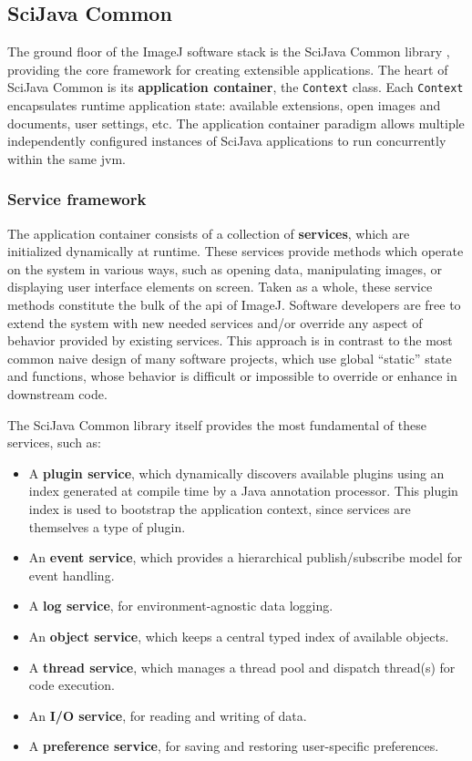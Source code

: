 \documentclass{bmcart}
\begin{document}
\subsection*{SciJava Common}
The ground floor of the ImageJ software stack is the SciJava Common library
\cite{imagej_sjc}, providing the core framework for creating extensible
applications. The heart of SciJava Common is its \textbf{application
container}, the \texttt{Context} class. Each \texttt{Context} encapsulates
runtime application state: available extensions, open images and documents,
user settings, etc. The application container paradigm allows multiple
independently configured instances of SciJava applications to run concurrently
within the same \acrfull{jvm}.

\subsubsection*{Service framework}
The application container consists of a collection of \textbf{services}, which
are initialized dynamically at runtime. These services provide methods which
operate on the system in various ways, such as opening data, manipulating
images, or displaying user interface elements on screen. Taken as a whole,
these service methods constitute the bulk of the \acrfull{api} of ImageJ.
Software developers are free to extend the system with new needed services
and/or override any aspect of behavior provided by existing services. This
approach is in contrast to the most common naive design of many software
projects, which use global ``static'' state and functions, whose behavior is
difficult or impossible to override or enhance in downstream code.

The SciJava Common library itself provides the most fundamental of these
services, such as:

\begin{itemize}
  \item A \textbf{plugin service}, which dynamically discovers available
    plugins using an index generated at compile time by a Java annotation
    processor. This plugin index is used to bootstrap the application context,
    since services are themselves a type of plugin.
  \item An \textbf{event service}, which provides a hierarchical
    publish/subscribe model for event handling.
  \item A \textbf{log service}, for environment-agnostic data logging.
  \item An \textbf{object service}, which keeps a central typed index of
    available objects.
  \item A \textbf{thread service}, which manages a thread pool and dispatch
    thread(s) for code execution.
  \item An \textbf{I/O service}, for reading and writing of data.
  \item A \textbf{preference service}, for saving and restoring user-specific
    preferences.
\end{itemize}
\end{document}
